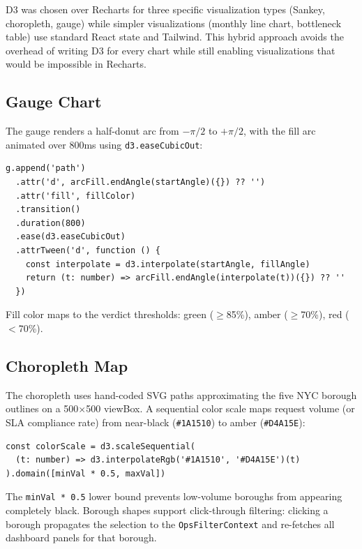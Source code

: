 \begin{decisionbox}
D3 was chosen over Recharts for three specific visualization types (Sankey, choropleth, gauge) while simpler visualizations (monthly line chart, bottleneck table) use standard React state and Tailwind. This hybrid approach avoids the overhead of writing D3 for every chart while still enabling visualizations that would be impossible in Recharts.
\end{decisionbox}

\subsection{Gauge Chart}

The gauge renders a half-donut arc from $-\pi/2$ to $+\pi/2$, with the fill arc animated over 800ms using \texttt{d3.easeCubicOut}:

\begin{lstlisting}[style=typescript, caption={Arc animation in \texttt{GaugeChart.tsx}}, label=lst:gauge-animation]
g.append('path')
  .attr('d', arcFill.endAngle(startAngle)({}) ?? '')
  .attr('fill', fillColor)
  .transition()
  .duration(800)
  .ease(d3.easeCubicOut)
  .attrTween('d', function () {
    const interpolate = d3.interpolate(startAngle, fillAngle)
    return (t: number) => arcFill.endAngle(interpolate(t))({}) ?? ''
  })
\end{lstlisting}

Fill color maps to the verdict thresholds: green ($\geq$85\%), amber ($\geq$70\%), red ($<$70\%).

\subsection{Choropleth Map}

The choropleth uses hand-coded SVG paths approximating the five NYC borough outlines on a 500$\times$500 viewBox. A sequential color scale maps request volume (or SLA compliance rate) from near-black (\texttt{\#1A1510}) to amber (\texttt{\#D4A15E}):

\begin{lstlisting}[style=typescript, caption={Color scale in \texttt{ChoroplethMap.tsx}}, label=lst:choropleth-scale]
const colorScale = d3.scaleSequential(
  (t: number) => d3.interpolateRgb('#1A1510', '#D4A15E')(t)
).domain([minVal * 0.5, maxVal])
\end{lstlisting}

The \texttt{minVal * 0.5} lower bound prevents low-volume boroughs from appearing completely black. Borough shapes support click-through filtering: clicking a borough propagates the selection to the \texttt{OpsFilterContext} and re-fetches all dashboard panels for that borough.

